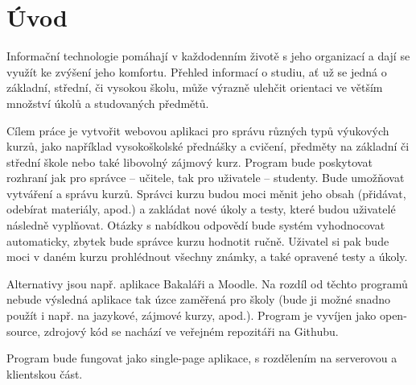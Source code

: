\chapter{Úvod}

Informační technologie pomáhají v každodenním životě s jeho organizací a dají se využít ke zvýšení
jeho komfortu. Přehled informací o studiu, ať už se jedná o základní, střední, či vysokou školu, může výrazně ulehčit orientaci ve větším množství úkolů a studovaných předmětů.

Cílem práce je vytvořit webovou aplikaci pro správu různých typů výukových kurzů, jako například vysokoškolské přednášky a cvičení, předměty na základní či střední škole nebo také libovolný zájmový kurz. Program bude poskytovat rozhraní jak pro správce – učitele, tak pro uživatele – studenty. Bude umožňovat vytváření a správu kurzů. Správci kurzu budou moci měnit jeho obsah (přidávat, odebírat materiály, apod.) a zakládat nové úkoly a testy, které budou uživatelé následně vyplňovat. Otázky s nabídkou odpovědí bude systém vyhodnocovat automaticky, zbytek bude správce kurzu hodnotit ručně. Uživatel si pak bude moci v daném kurzu prohlédnout všechny známky, a také opravené testy a úkoly.

Alternativy jsou např. aplikace Bakaláři a Moodle. Na rozdíl od těchto programů nebude výsledná aplikace tak úzce zaměřená pro školy (bude ji možné snadno použít i např. na jazykové, zájmové kurzy, apod.).
Program je vyvíjen jako open-source, zdrojový kód se nachází ve veřejném repozitáři na Githubu.

Program bude fungovat jako single-page aplikace, s rozdělením na serverovou a klientskou část. 